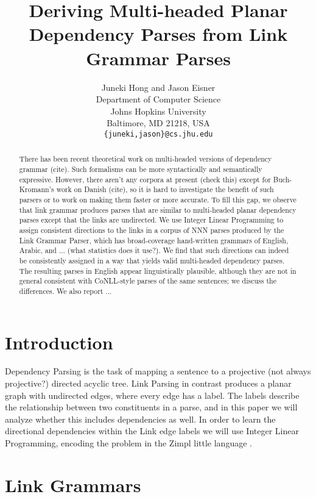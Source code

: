 \documentclass[11pt]{article}
\title{Deriving Multi-headed Planar Dependency Parses from Link Grammar Parses}
\author{Juneki Hong and Jason Eisner\\
  Department of Computer Science \\
  Johns Hopkins University \\
  Baltimore, MD 21218, USA \\ 
  {\tt \{juneki,jason\}@cs.jhu.edu} \\
}
\date{}
\begin{document}
\maketitle

\begin{abstract}

There has been recent theoretical work on multi-headed versions of dependency grammar (cite). Such formalisms can be more syntactically and semantically expressive. However, there aren't any corpora at present (check this) except for Buch-Kromann's work on Danish (cite), so it is hard to investigate the benefit of such parsers or to work on making them faster or more accurate. To fill this gap, we observe that link grammar produces parses that are similar to multi-headed planar dependency parses except that the links are undirected. We use Integer Linear Programming to assign consistent directions to the links in a corpus of NNN parses produced by the Link Grammar Parser, which has broad-coverage hand-written grammars of English, Arabic, and ... (what statistics does it use?). We find that such directions can indeed be consistently assigned in a way that yields valid multi-headed dependency parses. The resulting parses in English appear linguistically plausible, although they are not in general consistent with CoNLL-style parses of the same sentences; we discuss the differences. We also report ...

\end{abstract}




\section{Introduction}



Dependency Parsing is the task of mapping a sentence to a projective (not always projective?) directed acyclic tree. Link Parsing in contrast produces a planar graph with undirected edges, where every edge has a label. The labels describe the relationship between two constituents in a parse, and in this paper we will analyze whether this includes dependencies as well. In order to learn the directional dependencies within the Link edge labels we will use Integer Linear Programming, encoding the problem in the Zimpl little language \cite{Koch2004}. 



\section{Link Grammars}
\end{document}
